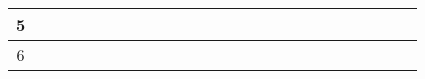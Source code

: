 \begin{table}[h]
\begin{tabular}{|c|cccccccccccc|cccccccccccc|}
		5                        & \multicolumn{1}{c|}{} & \multicolumn{1}{c|}{\cellcolor[HTML]{009901}} & \multicolumn{1}{c|}{\cellcolor[HTML]{009901}} & \multicolumn{1}{c|}{\cellcolor[HTML]{009901}} & \multicolumn{1}{c|}{\cellcolor[HTML]{009901}} & \multicolumn{1}{c|}{\cellcolor[HTML]{009901}} & \multicolumn{1}{c|}{\cellcolor[HTML]{009901}} & \multicolumn{1}{c|}{\cellcolor[HTML]{009901}} & \multicolumn{1}{c|}{\cellcolor[HTML]{FFFFFF}} & \multicolumn{1}{c|}{\cellcolor[HTML]{FFFFFF}} & \multicolumn{1}{c|}{\cellcolor[HTML]{FFFFFF}} & \cellcolor[HTML]{FFFFFF} & \multicolumn{1}{c|}{}                         & \multicolumn{1}{c|}{}                         & \multicolumn{1}{c|}{}                         & \multicolumn{1}{c|}{}                         & \multicolumn{1}{c|}{}                         & \multicolumn{1}{c|}{}                         & \multicolumn{1}{c|}{}                         & \multicolumn{1}{c|}{}                         & \multicolumn{1}{c|}{}                         & \multicolumn{1}{c|}{}                         & \multicolumn{1}{c|}{}                         &  \\ \hline
		6                        & \multicolumn{1}{c|}{} & \multicolumn{1}{c|}{}                         & \multicolumn{1}{c|}{}                         & \multicolumn{1}{c|}{}                         & \multicolumn{1}{c|}{}                         & \multicolumn{1}{c|}{}                         & \multicolumn{1}{c|}{}                         & \multicolumn{1}{c|}{}                         & \multicolumn{1}{c|}{}                         & \multicolumn{1}{c|}{}                         & \multicolumn{1}{c|}{}                         &                          & \multicolumn{1}{c|}{}                         & \multicolumn{1}{c|}{}                         & \multicolumn{1}{c|}{}                         & \multicolumn{1}{c|}{}                         & \multicolumn{1}{c|}{\cellcolor[HTML]{343434}} & \multicolumn{1}{c|}{\cellcolor[HTML]{343434}} & \multicolumn{1}{c|}{\cellcolor[HTML]{343434}} & \multicolumn{1}{c|}{}                         & \multicolumn{1}{c|}{}                         & \multicolumn{1}{c|}{}                         & \multicolumn{1}{c|}{}                         &  \\ \hline

\end{tabular}
\end{table}
